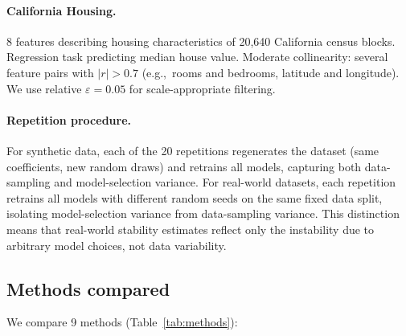 \documentclass[11pt]{article}
\newcommand{\eg}{e.g.,\ }
\begin{document}
\paragraph{California Housing.}
8 features describing housing characteristics of 20,640 California
census blocks. Regression task predicting median house value. Moderate
collinearity: several feature pairs with $|r| > 0.7$ (\eg rooms and
bedrooms, latitude and longitude).
We use relative $\varepsilon = 0.05$ for scale-appropriate filtering.

\paragraph{Repetition procedure.}
For synthetic data, each of the 20 repetitions regenerates the dataset
(same coefficients, new random draws) and retrains all models, capturing
both data-sampling and model-selection variance. For real-world datasets,
each repetition retrains all models with different random seeds on the
same fixed data split, isolating model-selection variance from
data-sampling variance. This distinction means that real-world stability
estimates reflect only the instability due to arbitrary model choices,
not data variability.

\subsection{Methods compared}

We compare 9 methods (Table~\ref{tab:methods}):
\end{document}

